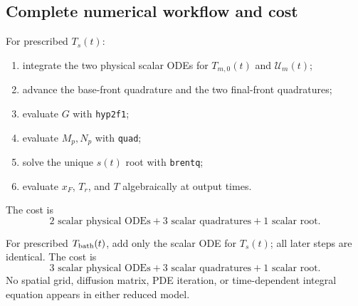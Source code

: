 \documentclass[11pt]{article}
\numberwithin{equation}{section}
\newcommand{\Ts}{T_s}
\newcommand{\Tb}{T_{\rm bath}}
\newcommand{\Tr}{T_r}
\newcommand{\Tm}{T_{m,0}}
\newcommand{\xf}{x_F}
\newcommand{\calU}{\mathcal{U}}
\begin{document}
\subsection*{Complete numerical workflow and cost}

For prescribed $\Ts(t)$:
\begin{enumerate}
 \item integrate the two physical scalar ODEs for $\Tm(t)$ and $\calU_m(t)$;
 \item advance the base-front quadrature and the two final-front quadratures;
 \item evaluate $G$ with \texttt{hyp2f1};
 \item evaluate $M_p,N_p$ with \texttt{quad};
 \item solve the unique $s(t)$ root with \texttt{brentq};
 \item evaluate $\xf$, $\Tr$, and $T$ algebraically at output times.
\end{enumerate}
The cost is
\begin{equation}
 \boxed{
 2\text{ scalar physical ODEs}
 +3\text{ scalar quadratures}
 +1\text{ scalar root}.}
 \label{eq:sum_cost_Ts}
\end{equation}

For prescribed $\Tb(t)$, add only the scalar ODE for $\Ts(t)$; all later steps
are identical.  The cost is
\begin{equation}
 \boxed{
 3\text{ scalar physical ODEs}
 +3\text{ scalar quadratures}
 +1\text{ scalar root}.}
 \label{eq:sum_cost_Tbath}
\end{equation}
No spatial grid, diffusion matrix, PDE iteration, or time-dependent integral
equation appears in either reduced model.
\end{document}
